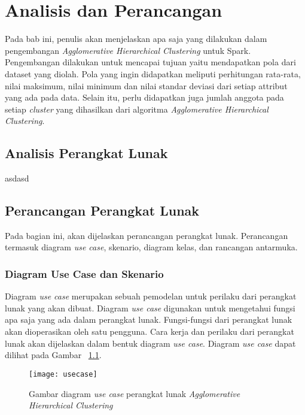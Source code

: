 \chapter{Analisis dan Perancangan}
\label{chap:Analisis dan Perancangan}

Pada bab ini, penulis akan menjelaskan apa saja yang dilakukan dalam pengembangan \textit{Agglomerative Hierarchical Clustering} untuk Spark. Pengembangan dilakukan untuk mencapai tujuan yaitu mendapatkan pola dari dataset yang diolah. Pola yang ingin didapatkan meliputi perhitungan rata-rata, nilai maksimum, nilai minimum dan nilai standar deviasi dari setiap attribut yang ada pada data. Selain itu, perlu didapatkan juga jumlah anggota pada setiap \textit{cluster} yang dihasilkan dari algoritma \textit{Agglomerative Hierarchical Clustering}.


\section{Analisis Perangkat Lunak}

asdasd

\section{Perancangan Perangkat Lunak}

Pada bagian ini, akan dijelaskan perancangan perangkat lunak.  Perancangan termasuk diagram \textit{use case}, skenario, diagram kelas, dan rancangan antarmuka. 

\subsection{Diagram Use Case dan Skenario}

Diagram \textit{use case} merupakan sebuah pemodelan untuk perilaku dari perangkat lunak yang akan dibuat. Diagram \textit{use case} digunakan untuk mengetahui fungsi apa saja yang ada dalam perangkat lunak. Fungsi-fungsi dari perangkat lunak akan dioperasikan oleh satu pengguna. Cara kerja dan perilaku dari perangkat lunak akan dijelaskan dalam bentuk diagram \textit{use case}. Diagram \textit{use case} dapat dilihat pada Gambar ~\ref{fig:usecase}.

\begin{figure}[H]
    \centering  
    \texttt{[image: usecase]}  
    \caption[Gambar diagram \textit{use case} perangkat lunak \textit{Agglomerative Hierarchical Clustering}]{Gambar diagram \textit{use case} perangkat lunak \textit{Agglomerative Hierarchical Clustering}} 
    \label{fig:usecase} 
\end{figure}

